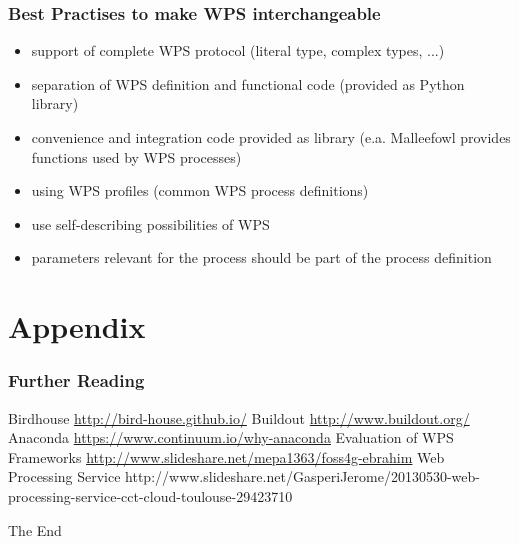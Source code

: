 \documentclass{beamer}
\begin{document}
  \begin{frame}
    \frametitle{Best Practises to make WPS interchangeable}
    \begin{itemize}
      \item support of complete WPS protocol (literal type, complex types, ...)
      \item separation of WPS definition and functional code (provided as Python library)
      \item convenience and integration code provided as library (e.a. Malleefowl provides functions used by WPS processes)
      \item using WPS profiles (common WPS process definitions)
      \item use self-describing possibilities of WPS
      \item parameters relevant for the process should be part of the process definition
    \end{itemize}
  \end{frame}


  \appendix

  \section{Appendix}
  
   \begin{frame}[allowframebreaks]
    \frametitle<presentation>{Further Reading}    
    \begin{thebibliography}{10}    
      \beamertemplatearticlebibitems
      Birdhouse
      \newblock \url{http://bird-house.github.io/}
      Buildout
      \newblock \url{http://www.buildout.org/}
      Anaconda
      \newblock \url{https://www.continuum.io/why-anaconda}
      Evaluation of WPS Frameworks
      \newblock \url{http://www.slideshare.net/mepa1363/foss4g-ebrahim}
      Web Processing Service
      \newblock http://www.slideshare.net/GasperiJerome/20130530-web-processing-service-cct-cloud-toulouse-29423710
   
    \end{thebibliography}
    
  \end{frame}
  

  \begin{frame}
    \Huge{\centerline{The End}}
  \end{frame}

\end{document}
